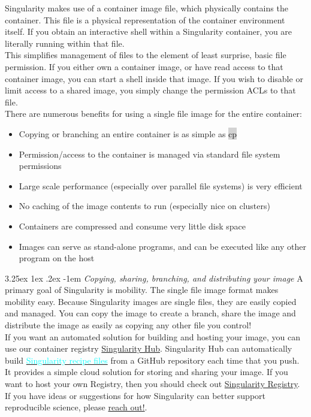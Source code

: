 \documentclass[a4paper]{article}
\makeatletter
\newcounter{subsubsubsection}[subsubsection]
\renewcommand\paragraph{\@startsection{paragraph}{5}{\z@}%
  {3.25ex \@plus1ex \@minus.2ex}%
  {-1em}%
  {\normalfont\normalsize\bfseries}}
\makeatother
\begin{document}
Singularity makes use of a container image file, which physically contains the container. This file is a physical representation of the container environment itself. If you obtain an interactive shell within a Singularity container, you are literally running within that file.
\\[0.2in]
This simplifies management of files to the element of least surprise, basic file permission. If you either own a container image, or have read access to that container image, you can start a shell inside that image. If you wish to disable or limit access to a shared image, you simply change the permission ACLs to that file.
\\[0.2in]
There are numerous benefits for using a single file image for the entire container:

\begin{itemize}
\item Copying or branching an entire container is as simple as \colorbox{lightgray}{cp}
\item Permission/access to the container is managed via standard file system permissions
\item Large scale performance (especially over parallel file systems) is very efficient
\item No caching of the image contents to run (especially nice on clusters)
\item Containers are compressed and consume very little disk space
\item Images can serve as stand-alone programs, and can be executed like any other program on the host
\end{itemize}

\paragraph{\textit{Copying, sharing, branching, and distributing your image}}	
	A primary goal of Singularity is mobility. The single file image format makes mobility easy. Because Singularity images are single files, they are easily copied and managed. You can copy the image to create a branch, share the image and distribute the image as easily as copying any other file you control!
\\[0.2in]
If you want an automated solution for building and hosting your image, you can use our container registry \href{https://singularity-hub.org/}{Singularity Hub}. Singularity Hub can automatically build \hyperref[sec:recipefiles]{{\textcolor{cyan}{Singularity recipe files}}} from a GitHub repository each time that you push. It provides a simple cloud solution for storing and sharing your image. If you want to host your own Registry, then you should check out \href{https://www.github.com/singularityhub/sregistry}{Singularity Registry}. If you have ideas or suggestions for how Singularity can better support reproducible science, please \href{https://www.sylabs.io/contact/}{reach out!}.
\end{document}
